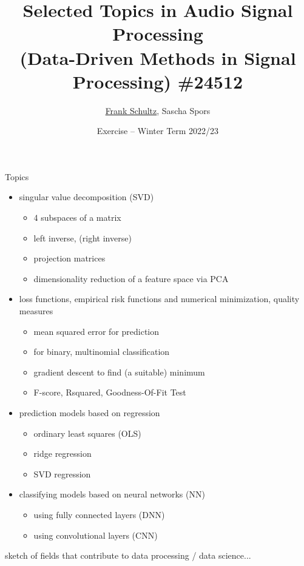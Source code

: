 \documentclass[mathserif, aspectratio=43]{intbeamer}
\title[STiASP \#24512 - Exercise]%
{Selected Topics in Audio Signal Processing\\(Data-Driven Methods in Signal Processing) \#24512}
\author[Schultz, Spors]{%
    \underline{Frank Schultz}, Sascha Spors}
\date[Winter Term 2022/23]{%
  Exercise -- Winter Term 2022/23}
\institute[]{Research Group Signal Processing and Virtual Acoustics,
University of Rostock}
\begin{document}
\maketitle
%
%
%

%
%
%

\begin{frame}{Topics}
\begin{itemize}
\item singular value decomposition (SVD)
  \begin{itemize}
  \item 4 subspaces of a matrix
  \item left inverse, (right inverse)
  \item projection matrices
  \item dimensionality reduction of a feature space via PCA
  \end{itemize}
\item loss functions, empirical risk functions and numerical minimization, quality measures
\begin{itemize}
\item mean squared error for prediction
\item for binary, multinomial classification
\item gradient descent to find (a suitable) minimum
\item F-score, Rsquared, Goodness-Of-Fit Test
\end{itemize}
\item prediction models based on regression
    \begin{itemize}
    \item ordinary least squares (OLS)
    \item ridge regression
    \item SVD regression
    \end{itemize}
\item classifying models based on neural networks (NN)
  \begin{itemize}
  \item using fully connected layers (DNN)
  \item using convolutional layers (CNN)
  \end{itemize}
\end{itemize}
sketch of fields that contribute to data processing / data science...
\end{frame}
%
%
%
\end{document}
